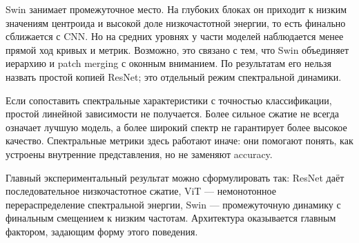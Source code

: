 Swin занимает промежуточное место. На глубоких блоках он приходит к низким значениям центроида и высокой доле низкочастотной энергии, то есть финально сближается с CNN. Но на средних уровнях у части моделей наблюдается менее прямой ход кривых и метрик. Возможно, это связано с тем, что Swin объединяет иерархию и patch merging с оконным вниманием. По результатам его нельзя назвать простой копией ResNet; это отдельный режим спектральной динамики.

Если сопоставить спектральные характеристики с точностью классификации, простой линейной зависимости не получается. Более сильное сжатие не всегда означает лучшую модель, а более широкий спектр не гарантирует более высокое качество. Спектральные метрики здесь работают иначе: они помогают понять, как устроены внутренние представления, но не заменяют accuracy.

Главный экспериментальный результат можно сформулировать так: ResNet даёт последовательное низкочастотное сжатие, ViT — немонотонное перераспределение спектральной энергии, Swin — промежуточную динамику с финальным смещением к низким частотам. Архитектура оказывается главным фактором, задающим форму этого поведения.



